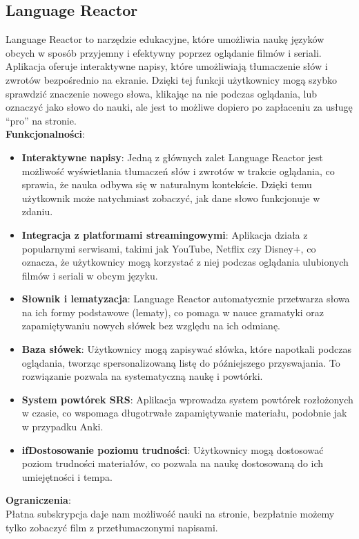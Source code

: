 \subsection{Language Reactor }
Language Reactor to narzędzie edukacyjne, które umożliwia naukę języków obcych w sposób przyjemny i efektywny poprzez oglądanie filmów i seriali. Aplikacja oferuje interaktywne napisy, które umożliwiają tłumaczenie słów i zwrotów bezpośrednio na ekranie. Dzięki tej funkcji użytkownicy mogą szybko sprawdzić znaczenie nowego słowa, klikając na nie podczas oglądania, lub oznaczyć jako słowo do nauki, ale jest to możliwe dopiero po zapłaceniu za usługę “pro” na stronie. \\
\textbf{Funkcjonalności}:
\begin{itemize}
    \item {\textbf{Interaktywne napisy}}: Jedną z głównych zalet Language Reactor jest możliwość wyświetlania tłumaczeń słów i zwrotów w trakcie oglądania, co sprawia, że nauka odbywa się w naturalnym kontekście. Dzięki temu użytkownik może natychmiast zobaczyć, jak dane słowo funkcjonuje w zdaniu.
    \item {\textbf{Integracja z platformami streamingowymi}}: Aplikacja działa z popularnymi serwisami, takimi jak YouTube, Netflix czy Disney+, co oznacza, że użytkownicy mogą korzystać z niej podczas oglądania ulubionych filmów i seriali w obcym języku.
    \item {\textbf{Słownik i lematyzacja}}: Language Reactor automatycznie przetwarza słowa na ich formy podstawowe (lematy), co pomaga w nauce gramatyki oraz zapamiętywaniu nowych słówek bez względu na ich odmianę.
    \item {\textbf{Baza słówek}}: Użytkownicy mogą zapisywać słówka, które napotkali podczas oglądania, tworząc spersonalizowaną listę do późniejszego przyswajania. To rozwiązanie pozwala na systematyczną naukę i powtórki.
    \item {\textbf{System powtórek SRS}}: Aplikacja wprowadza system powtórek rozłożonych w czasie, co wspomaga długotrwałe zapamiętywanie materiału, podobnie jak w przypadku Anki.
    \item {\textbf{ifDostosowanie poziomu trudności}}: Użytkownicy mogą dostosować poziom trudności materiałów, co pozwala na naukę dostosowaną do ich umiejętności i tempa.
\end{itemize}
\textbf{Ograniczenia}: \\
Płatna subskrypcja daje nam możliwość nauki na stronie, bezpłatnie możemy tylko zobaczyć film z przetłumaczonymi napisami.

